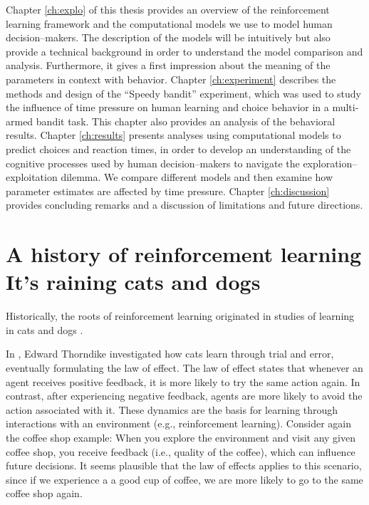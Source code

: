 Chapter \ref{ch:explo} of this thesis provides an overview of the reinforcement learning framework and the computational models we use to model human decision--makers. The description of the models will be intuitively but also provide a technical background in order to understand the model comparison and analysis. Furthermore, it gives a first impression about the meaning of the parameters in context with behavior. %
Chapter \ref{ch:experiment} describes the methods and design of the ``Speedy bandit'' experiment, which was used to study the influence of time pressure on human learning and choice behavior in a multi-armed bandit task. This chapter also provides an analysis of the behavioral results.
Chapter \ref{ch:results} presents analyses using computational models to predict choices and reaction times, in order to develop an understanding of the cognitive processes used by human decision--makers to navigate the exploration--exploitation dilemma. %
We compare different models and then examine how parameter estimates are affected by time pressure. %
Chapter \ref{ch:discussion} provides concluding remarks and a discussion of limitations and future directions. 


 
\section[A history of reinforcement learning. It's raining cats and dogs]{A history of reinforcement learning\\ {\large It's raining cats and dogs}} 
Historically, the roots of reinforcement learning originated in studies of learning in cats \citep{thorndike1927law} and dogs \citep{pavlov1927conditional}.

In \citeyear{thorndike1927law}, Edward Thorndike investigated how cats learn through trial and error, eventually formulating the law of effect.
The law of effect \cite{thorndike1927law} states that whenever an agent receives positive feedback, it is more likely to try the same action again. In contrast, after experiencing negative feedback, agents are more likely to avoid the action associated with it.
These dynamics are the basis for learning through interactions with an environment (e.g., reinforcement learning). Consider again the coffee shop example: When you explore the environment and visit any given coffee shop, you receive feedback (i.e., quality of the coffee), which can influence future decisions. It seems plausible that the law of effects applies to this scenario, since if we experience a a good cup of coffee, we are more likely to go to the same coffee shop again. 

